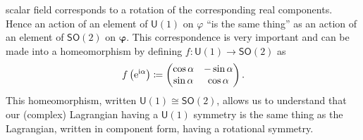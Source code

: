 scalar field corresponds to a rotation of the corresponding real components.
Hence an action of an element of \(\mathsf{U}(1)\) on \(\varphi\) ``is the same
thing'' as an action of an element of \(\mathsf{SO}(2)\) on \(\pmb{\varphi}\).
This correspondence is very important and can be made into a homeomorphism by
defining \(f:\mathsf{U}(1)\to \mathsf{SO}(2)\) as
\begin{equation}\label{eq:homeo}
    f\left(\mathrm{e}^{\mathrm{i}\alpha}\right)\coloneqq\begin{pmatrix} \cos{\alpha} & -\sin{\alpha} \\ \sin{\alpha} & \cos{\alpha} \end{pmatrix}.
\end{equation}
This homeomorphism, written \(\mathsf{U}(1)\cong \mathsf{SO}(2)\), allows us to
understand that our (complex) Lagrangian having a \(\mathsf{U}(1)\) symmetry is
the same thing as the Lagrangian, written in component form, having a rotational
symmetry.

